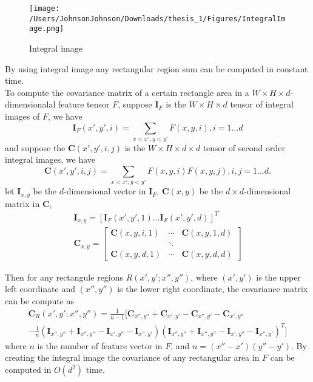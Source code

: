 \begin{figure}[H]
\centering
\texttt{[image: /Users/JohnsonJohnson/Downloads/thesis\_1/Figures/IntegralImage.png]}
\caption{Integral image}
\vspace{0em}
\end{figure} 
By using integral image any rectangular region sum can be computed in constant time. \\
\indent To compute the covariance matrix of a certain rectangle area in a $W\times H\times d$-dimensionalal feature tensor $F$, suppose $\bm{I}_F$ is the $W\times H\times d$ tensor of integral images of $F$, we have 
\begin{equation}
 \bm{I}_F(x', y', i) = \sum_{x < x', y < y'}F(x, y ,i), i = 1 \dots d
\end{equation} 
and suppose the $\bm{C}(x', y', i, j)$ is the $W\times H\times d\times d$ tensor of second order integral images, we have
\begin{equation}
\bm{C}(x', y', i, j) = \sum_{x<x', y<y'} F(x, y, i)F(x, y, j), i, j = 1 \dots d.
\end{equation}
let $\bm{I}_{x, y}$ be the $d$-dimensional vector in $\bm{I}_F$, $\bm{C}(x, y)$ be the $d\times d$-dimensional matrix in $\bm{C}$, 
\begin{equation}
\begin{aligned}
\bm{I}_{x, y} = [ \bm{I}_F(x', y', 1) \dots  \bm{I}_F(x', y', d)]^T \\
 \bm{C}_{x, y} = \left [
 \begin{matrix} 
 \bm{C}(x, y, i, 1)  &\cdots & \bm{C}(x, y, 1, d)\\
 			     & \ddots &			        \\
\bm{C}(x, y, d, 1)   & \cdots &\bm{C}(x, y, d, d)
 
 \end{matrix} \right ]
 \end{aligned}
\end{equation}

Then for any rectangule regions $R(x', y'; x'', y'')$, where $(x', y')$ is the upper left coordinate and $(x'', y'')$ is the lower right coordinate, the covariance matrix can be compute as 
\begin{equation}
\begin{aligned}
\bm{C}_R(x', y'; x'', y'') = \frac{1}{n-1} [\bm{C}_{x'', y''} + \bm{C}_{x', y'} -  \bm{C}_{x'', y'}-  \bm{C}_{x', y''} \\
-\frac{1}{n}(\bm{I}_{x'', y''} + \bm{I}_{x'', y''} - \bm{I}_{x', y''} - \bm{I}_{x'', y'})(\bm{I}_{x'', y''} + \bm{I}_{x'', y''} - \bm{I}_{x', y''} - \bm{I}_{x'', y'})^T]
\end{aligned}
\end{equation}
where $n$ is the number of feature vector in $F$, and $n = (x'' - x')(y'' - y')$. By creating the integral image the covariance of any rectangular area in $F$ can be computed in $O(d^2)$ time.


